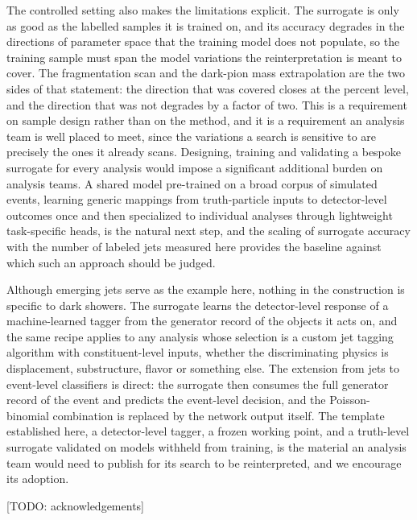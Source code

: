 \documentclass[a4paper,11pt]{article}
\newcommand{\todo}[1]{{\color{red!70!black}[TODO: #1]}}
\begin{document}
The controlled setting also makes the limitations explicit. The
surrogate is only as good as the labelled samples it is trained on, and
its accuracy degrades in the directions of parameter space that the
training model does not populate, so the training sample must span the
model variations the reinterpretation is meant to cover. The
fragmentation scan and the dark-pion mass extrapolation are the two
sides of that statement: the direction that was covered closes at the
percent level, and the direction that was not degrades by a factor of
two. This is a requirement on sample design rather than on the method,
and it is a requirement an analysis team is well placed to meet, since
the variations a search is sensitive to are precisely the ones it
already scans. Designing,
training and validating a bespoke surrogate for every analysis would
impose a significant additional burden on analysis teams. A shared
model pre-trained on a broad corpus of simulated events, learning
generic mappings from truth-particle inputs to detector-level outcomes
once and then specialized to individual analyses through lightweight
task-specific heads, is the natural next step, and the scaling of
surrogate accuracy with the number of labeled jets measured here
provides the baseline against which such an approach should be judged.

Although emerging jets serve as the example here, nothing in the
construction is specific to dark showers. The surrogate learns the
detector-level response of a machine-learned tagger from the generator
record of the objects it acts on, and the same recipe applies to any
analysis whose selection is a custom jet tagging algorithm with
constituent-level inputs, whether the discriminating physics is
displacement, substructure, flavor or something else. The extension
from jets to event-level classifiers is direct: the surrogate then
consumes the full generator record of the event and predicts the
event-level decision, and the Poisson-binomial combination is replaced
by the network output itself. The template established here, a
detector-level tagger, a frozen working point, and a truth-level
surrogate validated on models withheld from training, is the material
an analysis team would need to publish for its search to be
reinterpreted, and we encourage its adoption.

\acknowledgments

\todo{acknowledgements}
\end{document}
